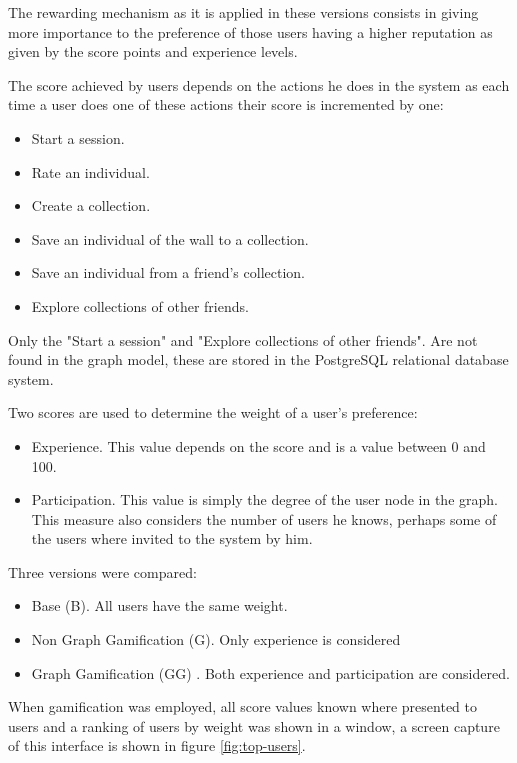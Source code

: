 \documentclass[conference]{IEEEtran}
\begin{document}
The rewarding mechanism as it is applied in these versions 
consists in giving more importance to the preference of those users having a higher reputation
as given by the score points and experience levels.  

The score achieved by users depends on the actions he does in the system as
each time a user does one of these actions their score is incremented by one:
\begin{itemize}
\item Start a session.
\item Rate an individual.
\item Create a collection.
\item Save an individual of the wall to a collection.
\item Save an individual from a friend's collection.
\item Explore collections of other friends.
\end{itemize}

Only the "Start a session" and "Explore collections of other friends". 
Are not found in the graph model, these are stored in the PostgreSQL relational
database system. 

Two scores are used to determine the weight of a user's preference:
\begin{itemize}
\item Experience. This value depends on the score and is a value 
between 0 and 100. 

\item Participation. This value is simply the degree of the user node 
in the graph. This measure also considers the number of users he knows,
perhaps some of the users where invited to the system by him.   
\end{itemize}

Three versions were compared:
\begin{itemize}
\item Base (B). All users have the same weight.
\item Non Graph Gamification (G). Only experience is considered
\item Graph Gamification (GG) . Both experience and participation are considered.
\end{itemize}
When gamification was employed, all score values known where presented to users
and a ranking of users by weight was shown in a window, a screen capture of
this interface is shown in figure \ref{fig:top-users}. 
\end{document}
